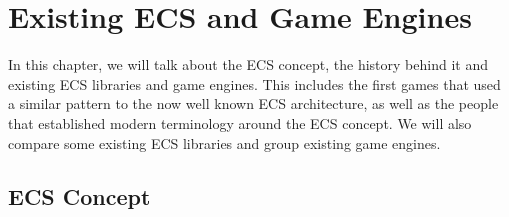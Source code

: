 \chapter{Existing ECS and Game Engines}\label{chap:existing}

In this chapter, we will talk about the ECS concept, the history behind it and existing ECS libraries and game engines. This includes the first games that used a similar pattern to the now well known ECS architecture, as well as the people that established modern terminology around the ECS concept. We will also compare some existing ECS libraries and group existing game engines.

\section{ECS Concept}

